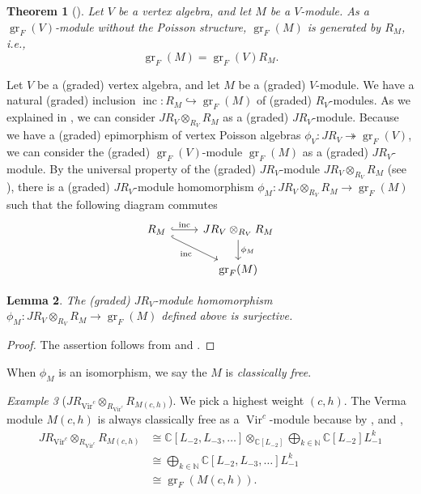 \documentclass[a4paper, 12pt, reqno]{amsart}
\newtheorem{theorem}{Theorem}[section]
\newtheorem{lemma}[theorem]{Lemma}
\theoremstyle{remark}
\newtheorem{example}[theorem]{Example}
\DeclareMathOperator{\Vir}{Vir}
\DeclareMathOperator{\gr}{gr}
\DeclareMathOperator{\inc}{inc}
\begin{document}
\begin{theorem}[{\cite[Lemma 4.2]{li_abelianizing_2005}}]
  \label{thr:13}
  Let $V$ be a vertex algebra, and let $M$ be a $V$-module.
  As a $\gr_F(V)$-module without the Poisson structure, $\gr_F(M)$ is generated by $R_M$, i.e.,
  \begin{equation*}
    \gr_F(M) = \gr_F(V)R_M.
  \end{equation*}
\end{theorem}

Let $V$ be a (graded) vertex algebra, and let $M$ be a (graded) $V$-module.
We have a natural (graded) inclusion $\inc: R_M \hookrightarrow \gr_F(M)$ of (graded) $R_V$-modules.
As we explained in , we can consider $JR_V \otimes_{R_V} R_M$ as a (graded) $JR_V$-module.
Because we have a (graded) epimorphism of vertex Poisson algebras $\phi_V: JR_V \twoheadrightarrow \gr_F(V)$, we can consider the (graded) $\gr_F(V)$-module $\gr_F(M)$ as a (graded) $JR_V$-module.
By the universal property of the (graded) $JR_V$-module $JR_V \otimes_{R_V} R_M$ (see ), there is a (graded) $JR_V$-module homomorphism $\phi_M: JR_V \otimes_{R_V} R_M \to \gr_F(M)$ such that the following diagram commutes
\begin{equation*}
  \begin{tikzcd}
    R_M \arrow[r, "\inc", hook] \arrow[rd, "\inc"', hook] & JR_V \otimes_{R_V} R_M \arrow[d, "\phi_M"] \\
    & \gr_F(M)
  \end{tikzcd}
\end{equation*}

\begin{lemma}
  \label{lmm:8}
  The (graded) $JR_V$-module homomorphism $\phi_M: JR_V \otimes_{R_V} R_M \to \gr_F(M)$ defined above is surjective.
\end{lemma}

\begin{proof}
  The assertion follows from  and .
\end{proof}

When $\phi_M$ is an isomorphism, we say the $M$ is \emph{classically free}.

\begin{example}[$JR_{\Vir^c} \otimes_{R_{\Vir^c}} R_{M(c, h)}$]
  \label{exa:21}
  We pick a highest weight $(c, h)$.
  The Verma module $M(c, h)$ is always classically free as a $\Vir^c$-module because by ,  and ,
  \begin{align*}
    JR_{\Vir^c} \otimes_{R_{\Vir^c}} R_{M(c, h)} &\cong \mathbb{C}[L_{-2}, L_{-3}, \dots] \otimes_{\mathbb{C}[L_{-2}]} \bigoplus_{k \in \mathbb{N}}\mathbb{C}[L_{-2}]L_{-1}^k \\
                                                 &\cong \bigoplus_{k \in \mathbb{N}}\mathbb{C}[L_{-2}, L_{-3}, \dots]L_{-1}^k \\
                                                 &\cong \gr_F(M(c, h)).
  \end{align*}
\end{example}
\end{document}
